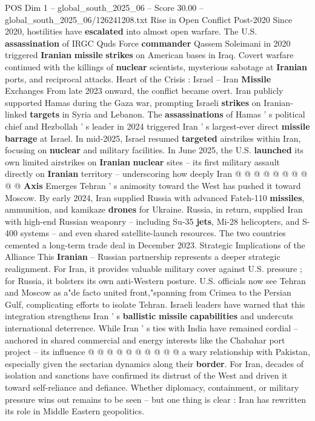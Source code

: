 \begin{textsample}{POS Dim 1 – global\_south\_2025\_06 – Score 30.00 – global\_south\_2025\_06/126241208.txt}
Rise in Open Conflict Post-2020 Since 2020, hostilities have \textbf{escalated} into almost open warfare.
The U.S. \textbf{assassination} of IRGC Quds Force \textbf{commander} Qassem Soleimani in 2020 triggered \textbf{Iranian} \textbf{missile} \textbf{strikes} on American bases in Iraq.
Covert warfare continued with the killings of \textbf{nuclear} scientists, mysterious sabotage at \textbf{Iranian} ports, and reciprocal attacks.
Heart of the Crisis : Israel -- Iran \textbf{Missile} Exchanges From late 2023 onward, the conflict became overt.
Iran publicly supported Hamas during the Gaza war, prompting Israeli \textbf{strikes} on Iranian-linked \textbf{targets} in Syria and Lebanon.
The \textbf{assassinations} of Hamas ' s political chief and Hezbollah ' s leader in 2024 triggered Iran ' s largest-ever direct \textbf{missile} \textbf{barrage} at Israel.
In mid-2025, Israel resumed \textbf{targeted} airstrikes within Iran, focusing on \textbf{nuclear} and military facilities.
In June 2025, the U.S. \textbf{launched} its own limited airstrikes on \textbf{Iranian} \textbf{nuclear} sites -- its first military assault directly on \textbf{Iranian} territory -- underscoring how deeply Iran @ @ @ @ @ @ @ @ @ @ \textbf{Axis} Emerges Tehran ' s animosity toward the West has pushed it toward Moscow.
By early 2024, Iran supplied Russia with advanced Fateh-110 \textbf{missiles}, ammunition, and kamikaze \textbf{drones} for Ukraine.
Russia, in return, supplied Iran with high-end Russian weaponry -- including Su-35 \textbf{jets}, Mi-28 helicopters, and S-400 systems -- and even shared satellite-launch resources.
The two countries cemented a long-term trade deal in December 2023.
Strategic Implications of the Alliance This \textbf{Iranian} -- Russian partnership represents a deeper strategic realignment.
For Iran, it provides valuable military cover against U.S. pressure ; for Russia, it bolsters its own anti-Western posture.
U.S. officials now see Tehran and Moscow as a"de facto united front,"spanning from Crimea to the Persian Gulf, complicating efforts to isolate Tehran.
Israeli leaders have warned that this integration strengthens Iran ' s \textbf{ballistic} \textbf{missile} \textbf{capabilities} and undercuts international deterrence.
While Iran ' s ties with India have remained cordial -- anchored in shared commercial and energy interests like the Chabahar port project -- its influence @ @ @ @ @ @ @ @ @ @ a wary relationship with Pakistan, especially given the sectarian dynamics along their \textbf{border}.
For Iran, decades of isolation and sanctions have confirmed its distrust of the West and driven it toward self-reliance and defiance.
Whether diplomacy, containment, or military pressure wins out remains to be seen -- but one thing is clear : Iran has rewritten its role in Middle Eastern geopolitics.

\end{textsample}
